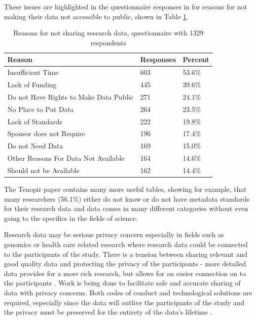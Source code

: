 These issues are highlighted in the questionnaire responses in
\cite{tenopir2011data} for reasons for not making their data not accessible
to public, shown in Table \ref{table:reasons_not_sharing}.

\begin{table}[h]
    \centering
    \caption{Reasons for not sharing research data, questionnaire with 1329
    respondents \cite{tenopir2011data}}
    \label{table:reasons_not_sharing}
    \begin{tabular}{| l | l | l |}
      \hline
      \textbf{Reason}                           & \textbf{Responses}    & \textbf{Percent} \\
      \hline
      \rowcolor{Gray}
      Insufficient Time                         & 603                   & 53.6\% \\
      \hline
      Lack of Funding                           & 445                   & 39.6\% \\
      \hline
      \rowcolor{Gray}
      Do not Have Rights to Make Data Public    & 271                   & 24.1\% \\
      \hline
      No Place to Put Data                      & 264                   & 23.5\% \\
      \hline
      \rowcolor{Gray}
      Lack of Standards                         & 222                   & 19.8\% \\
      \hline
      Sponsor does not Require                  & 196                   & 17.4\% \\
      \hline
      \rowcolor{Gray}
      Do not Need Data                          & 169                   & 15.0\% \\
      \hline
      Other Reasons For Data Not Available      & 164                   & 14.6\% \\
      \hline
      \rowcolor{Gray}
      Should not be Available                   & 162                   & 14.4\% \\
      \hline
    \end{tabular}
\end{table}

The Tenopir paper \cite{tenopir2011data} contains many more useful tables,
showing for example, that many researchers (56.1\%) either do not know or do not have
metadata standards for their research data and data comes in many different
categories without even going to the specifics in the fields of science.

Research data may be serious privacy concern especially in fields such as
genomics or health care related research where research data could be connected
to the participants of the study. There is a tension between sharing relevant
and good quality data and protecting the privacy of the participants - more
detailed data provides for a more rich research, but allows for an easier
connection on to the participants \cite{kaye2012tension}. Work is being done
to facilitate safe and accurate sharing of data with privacy concerns. Both
codes of conduct and technological solutions are required, especially since the
data will outlive the participants of the study and the privacy must be
preserved for the entirety of the data's lifetime
\cite{DBLP:journals/jam/NohCJ14a, knoppers2011towards}.

